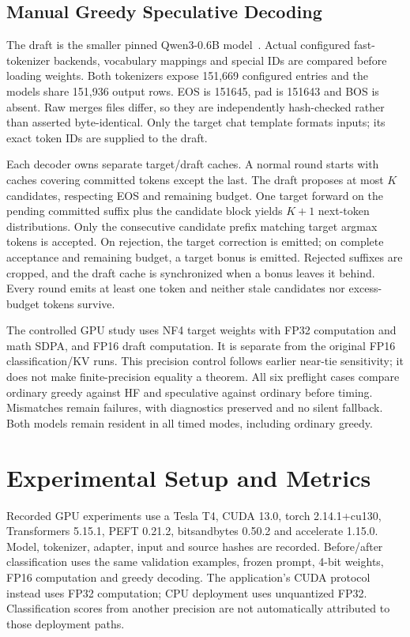 \documentclass[conference]{IEEEtran}
\begin{document}
\subsection{Manual Greedy Speculative Decoding}
The draft is the smaller pinned Qwen3-0.6B model~\cite{qwendraft}. Actual configured fast-tokenizer backends, vocabulary mappings and special IDs are compared before loading weights. Both tokenizers expose 151,669 configured entries and the models share 151,936 output rows. EOS is 151645, pad is 151643 and BOS is absent. Raw merges files differ, so they are independently hash-checked rather than asserted byte-identical. Only the target chat template formats inputs; its exact token IDs are supplied to the draft.

Each decoder owns separate target/draft caches. A normal round starts with caches covering committed tokens except the last. The draft proposes at most $K$ candidates, respecting EOS and remaining budget. One target forward on the pending committed suffix plus the candidate block yields $K+1$ next-token distributions. Only the consecutive candidate prefix matching target argmax tokens is accepted. On rejection, the target correction is emitted; on complete acceptance and remaining budget, a target bonus is emitted. Rejected suffixes are cropped, and the draft cache is synchronized when a bonus leaves it behind. Every round emits at least one token and neither stale candidates nor excess-budget tokens survive.

The controlled GPU study uses NF4 target weights with FP32 computation and math SDPA, and FP16 draft computation. It is separate from the original FP16 classification/KV runs. This precision control follows earlier near-tie sensitivity; it does not make finite-precision equality a theorem. All six preflight cases compare ordinary greedy against HF and speculative against ordinary before timing. Mismatches remain failures, with diagnostics preserved and no silent fallback. Both models remain resident in all timed modes, including ordinary greedy.

\section{Experimental Setup and Metrics}
Recorded GPU experiments use a Tesla T4, CUDA 13.0, torch 2.14.1+cu130, Transformers 5.15.1, PEFT 0.21.2, bitsandbytes 0.50.2 and accelerate 1.15.0. Model, tokenizer, adapter, input and source hashes are recorded. Before/after classification uses the same validation examples, frozen prompt, 4-bit weights, FP16 computation and greedy decoding. The application's CUDA protocol instead uses FP32 computation; CPU deployment uses unquantized FP32. Classification scores from another precision are not automatically attributed to those deployment paths.
\end{document}
